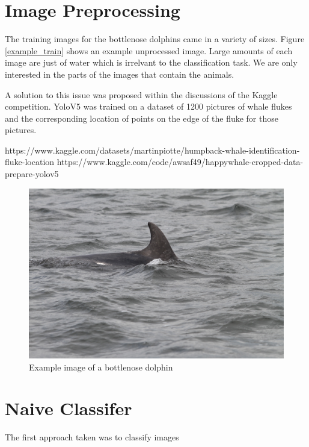 \documentclass{article}
\begin{document}
\section{Image Preprocessing}

The training images for the bottlenose dolphins came in a variety of sizes. Figure \ref{example_train} shows an example unprocessed image. Large amounts of each image are just of water which is irrelvant to the classification task. We are only interested in the parts of the 
images that contain the animals.

A solution to this issue was proposed within the discussions of the Kaggle competition. YoloV5 was trained on a dataset of 1200 pictures of whale flukes and the corresponding location of points on the edge of the fluke for those pictures. 

https://www.kaggle.com/datasets/martinpiotte/humpback-whale-identification-fluke-location
https://www.kaggle.com/code/awsaf49/happywhale-cropped-data-prepare-yolov5



\begin{figure}
    \includegraphics[width=\linewidth]{example_train.jpg}
    \caption{Example image of a bottlenose dolphin}
    \label{fig:example_train}
\end{figure}


\section{Naive Classifer}

The first approach taken was to classify images
\end{document}

